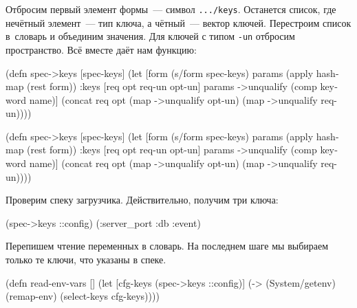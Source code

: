 Отбросим первый элемент формы~--- символ \verb|.../keys|. Останется список, где
нечётный элемент~--- тип ключа, а чётный~--- вектор ключей. Перестроим список
в~словарь и объединим значения. Для ключей с типом \verb|-un| отбросим
пространство. Всё вместе даёт нам функцию:


\ifnarrow

\begin{english}
  \begin{clojure}
(defn spec->keys
  [spec-keys]
  (let [form (s/form spec-keys)
        params (apply hash-map
                 (rest form))
        {:keys [req opt req-un opt-un]}
        params
        ->unqualify (comp keyword name)]
    (concat req
            opt
            (map ->unqualify opt-un)
            (map ->unqualify req-un))))
  \end{clojure}
\end{english}

\else

\begin{english}
  \begin{clojure}
(defn spec->keys
  [spec-keys]
  (let [form (s/form spec-keys)
        params (apply hash-map (rest form))
        {:keys [req opt req-un opt-un]} params
        ->unqualify (comp keyword name)]
    (concat req
            opt
            (map ->unqualify opt-un)
            (map ->unqualify req-un))))
  \end{clojure}
\end{english}

\fi

\noindent
Проверим спеку загрузчика. Действительно, получим три ключа:

\begin{english}
  \begin{clojure}
(spec->keys ::config)
(:server_port :db :event)
  \end{clojure}
\end{english}

\noindent
Перепишем чтение переменных в словарь. На последнем шаге мы выбираем только те
ключи, что указаны в спеке.

\begin{english}
  \begin{clojure}
(defn read-env-vars []
  (let [cfg-keys (spec->keys ::config)]
    (-> (System/getenv)
        (remap-env)
        (select-keys cfg-keys))))
  \end{clojure}
\end{english}

